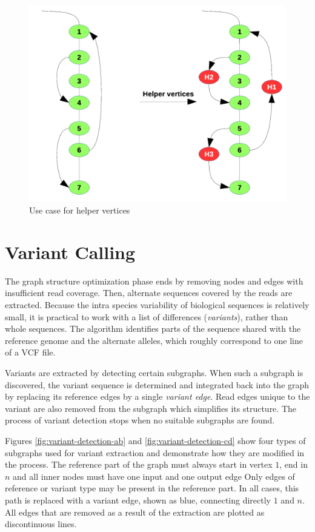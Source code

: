 \begin{figure}[h]
	\centering
	\includegraphics{img/helper-vertices.pdf}
	\caption{Use case for helper vertices}
	\label{fig:helper-vertices}
\end{figure}

\section{Variant Calling}
\label{sec:variant-calling}

The graph structure optimization phase ends by removing nodes and edges with insufficient read coverage. Then, alternate sequences covered by the reads are extracted. Because the intra species variability of biological sequences is relatively
small, it is practical to work with a list of differences (\textit{variants}), rather than whole sequences. The algorithm identifies parts of the sequence shared with the reference genome and the alternate alleles, which roughly correspond to one line of a VCF file. 

Variants are extracted by detecting certain subgraphs. When such a subgraph is discovered, the variant sequence is determined and integrated back into the graph by replacing its reference edges by a single \textit{variant edge}. Read edges unique to the variant are also removed from the subgraph which simplifies its structure. The process of variant detection stops when no suitable subgraphs are found.

Figures \ref{fig:variant-detection-ab} and \ref{fig:variant-detection-cd} show four types of subgraphs used for variant extraction and demonstrate how they are modified in the process. The reference part of the graph must always start in vertex $1$, end in $n$ and all inner nodes must have one input and one output edge Only edges of reference or variant type may be present in the reference part. In all cases, this path is replaced with a variant edge, shown as blue, connecting directly $1$ and $n$. All edges that are removed as a result of the extraction are plotted as discontinuous lines.

